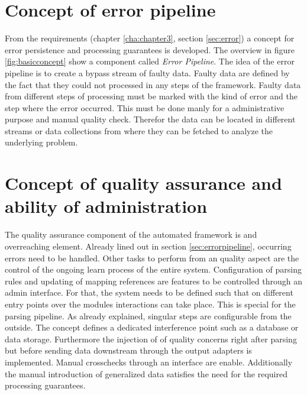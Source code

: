 \section{Concept of error pipeline \label{sec:errorpipeline}}

From the requirements (chapter \ref{cha:chapter3}, section \ref{sec:error}) a concept for error persistence and processing guarantees is developed. The overview in figure \ref{fig:basicconcept} show a component called \textit{Error Pipeline}. The idea of the error pipeline is to create a bypass stream of faulty data. Faulty data are defined by the fact that they could not processed in any steps of the framework. Faulty data from different steps of processing must be marked with the kind of error and the step where the error occurred. This must be done manly for a administrative purpose and manual quality check. Therefor the data can be located in different streams or data collections from where they can be fetched to analyze the underlying problem.

\section{Concept of quality assurance and ability of administration}

The quality assurance component of the automated framework is and overreaching element. Already lined out in section \ref{sec:errorpipeline}, occurring errors need to be handled. Other tasks to perform from an quality aspect are the control of the ongoing learn process of the entire system. Configuration of parsing rules and updating of mapping references are features to be controlled through an admin interface. For that, the system needs to be defined such that on different entry points over the modules interactions can take place. This is special for the parsing pipeline. As already explained, singular steps are configurable from the outside. The concept defines a dedicated interference point such as a database or data storage. Furthermore the injection of of quality concerns right after parsing but before sending data downstream through the output adapters is implemented. Manual crosschecks through an interface are enable. Additionally the manual introduction of generalized data satisfies the need for the required processing guarantees. 